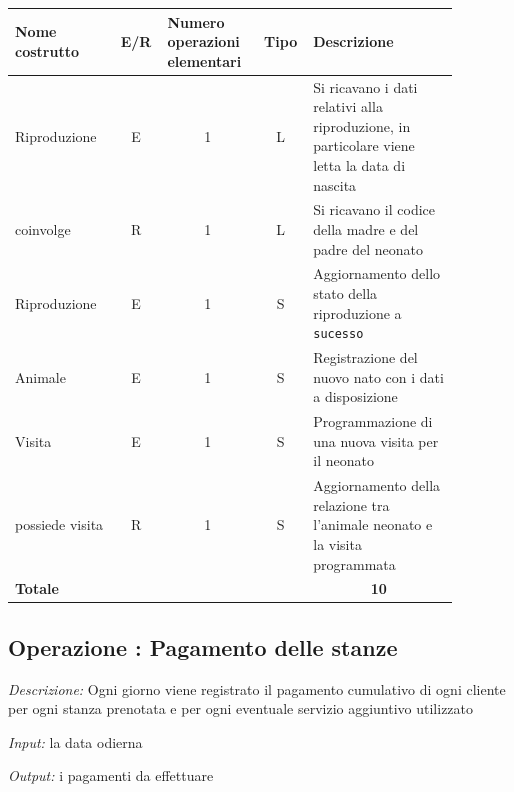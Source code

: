 \documentclass[12pt,a4paper]{article}
\begin{document}
\begin{center}\setlength{\extrarowheight}{1.5pt}\begin{longtable}{|p{0.2\linewidth}|p{0.1\linewidth}|p{0.175\linewidth}|p{0.1\linewidth}|p{0.3\linewidth}|}\hline \textbf{Nome costrutto}   & \multicolumn{1}{|c|}{\textbf{E/R}} & \textbf{Numero operazioni elementari} & \multicolumn{1}{|c|}{\textbf{Tipo}} & \textbf{Descrizione}\\ 
\hline
Riproduzione
 & 
\multicolumn{1}{|c|}{E}
 & 
\multicolumn{1}{|c|}{1}
 & 
\multicolumn{1}{|c|}{L}
 & 
Si ricavano i dati relativi alla riproduzione, in particolare viene letta la data di nascita
\\
\hline
coinvolge
 & 
\multicolumn{1}{|c|}{R}
 & 
\multicolumn{1}{|c|}{1}
 & 
\multicolumn{1}{|c|}{L}
 & 
Si ricavano il codice della madre e del padre del neonato
\\
\hline
Riproduzione
 & 
\multicolumn{1}{|c|}{E}
 & 
\multicolumn{1}{|c|}{1}
 & 
\multicolumn{1}{|c|}{S}
 & 
Aggiornamento dello stato della riproduzione a \texttt{sucesso}
\\
\hline
Animale
 & 
\multicolumn{1}{|c|}{E}
 & 
\multicolumn{1}{|c|}{1}
 & 
\multicolumn{1}{|c|}{S}
 & 
Registrazione del nuovo nato con i dati a disposizione
\\
\hline
Visita
 & 
\multicolumn{1}{|c|}{E}
 & 
\multicolumn{1}{|c|}{1}
 & 
\multicolumn{1}{|c|}{S}
 & 
Programmazione di una nuova visita per il neonato
\\
\hline
possiede visita
 & 
\multicolumn{1}{|c|}{R}
 & 
\multicolumn{1}{|c|}{1}
 & 
\multicolumn{1}{|c|}{S}
 & 
Aggiornamento della relazione tra l'animale neonato e la visita programmata
\\
\hline
\multicolumn{4}{|l|}{\textbf{Totale}}
 & 
\multicolumn{1}{|c|}{\textbf{10}}
\\
\hline
\end{longtable}\end{center}

\subsection*{Operazione \thecounterAccessi{}: Pagamento delle stanze}
\noindent\textit{Descrizione:} Ogni giorno viene registrato il pagamento cumulativo di ogni cliente per ogni stanza prenotata e per ogni eventuale servizio aggiuntivo utilizzato

\noindent\textit{Input:} la data odierna

\noindent\textit{Output:} i pagamenti da effettuare
\end{document}
